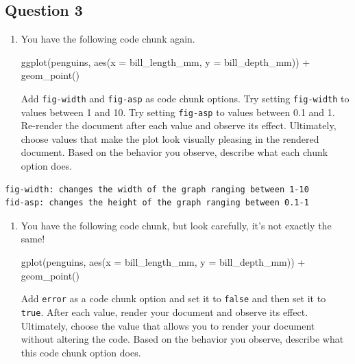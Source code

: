 \documentclass[
  letterpaper,
  DIV=11,
  numbers=noendperiod]{scrartcl}
\newenvironment{Shaded}{\begin{snugshade}}{\end{snugshade}}
\newcommand{\AttributeTok}[1]{\textcolor[rgb]{0.40,0.45,0.13}{#1}}
\newcommand{\FunctionTok}[1]{\textcolor[rgb]{0.28,0.35,0.67}{#1}}
\newcommand{\NormalTok}[1]{\textcolor[rgb]{0.00,0.23,0.31}{#1}}
\newcommand{\SpecialCharTok}[1]{\textcolor[rgb]{0.37,0.37,0.37}{#1}}
\begin{document}
\subsection{Question 3}\label{question-3}

\begin{enumerate}
\def\labelenumi{\alph{enumi}.}
\item
  You have the following code chunk again.

\begin{Shaded}
\begin{Highlighting}[]
\FunctionTok{ggplot}\NormalTok{(penguins, }\FunctionTok{aes}\NormalTok{(}\AttributeTok{x =}\NormalTok{ bill\_length\_mm, }\AttributeTok{y =}\NormalTok{ bill\_depth\_mm)) }\SpecialCharTok{+} 
  \FunctionTok{geom\_point}\NormalTok{()}
\end{Highlighting}
\end{Shaded}

  Add \texttt{fig-width} and \texttt{fig-asp} as code chunk options. Try
  setting \texttt{fig-width} to values between 1 and 10. Try setting
  \texttt{fig-asp} to values between 0.1 and 1. Re-render the document
  after each value and observe its effect. Ultimately, choose values
  that make the plot look visually pleasing in the rendered document.
  Based on the behavior you observe, describe what each chunk option
  does.
\end{enumerate}

\begin{verbatim}
fig-width: changes the width of the graph ranging between 1-10
fid-asp: changes the height of the graph ranging between 0.1-1
\end{verbatim}

\begin{enumerate}
\def\labelenumi{\alph{enumi}.}
\setcounter{enumi}{1}
\item
  You have the following code chunk, but look carefully, it's not
  exactly the same!

\begin{Shaded}
\begin{Highlighting}[]
\FunctionTok{gplot}\NormalTok{(penguins, }\FunctionTok{aes}\NormalTok{(}\AttributeTok{x =}\NormalTok{ bill\_length\_mm, }\AttributeTok{y =}\NormalTok{ bill\_depth\_mm)) }\SpecialCharTok{+} 
  \FunctionTok{geom\_point}\NormalTok{()}
\end{Highlighting}
\end{Shaded}

  Add \texttt{error} as a code chunk option and set it to \texttt{false}
  and then set it to \texttt{true}. After each value, render your
  document and observe its effect. Ultimately, choose the value that
  allows you to render your document without altering the code. Based on
  the behavior you observe, describe what this code chunk option does.
\end{enumerate}
\end{document}

